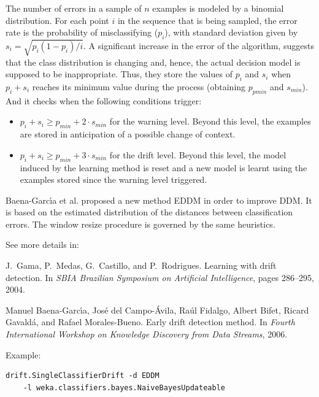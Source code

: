 \documentclass[a4paper,12pt,twoside]{book}
\begin{document}
The number of errors in a sample of $n$ examples is modeled by a binomial 
distribution. For each point $i$ in the sequence that is being sampled, the error
rate is the probability of misclassifying ($p_i$), with standard deviation given
by $s_i = \sqrt{p_i(1 - p_i)/i}$. 
A significant increase in the error of the algorithm, suggests
that the class distribution is changing and, hence, the actual decision model is
supposed to be inappropriate. Thus, they store the values of $p_i$ and $s_i$ when
$p_i+s_i$ reaches its minimum value during the process (obtaining $p_{pmin}$ and $s_{min}$).
And it checks when the following conditions trigger:
\begin{itemize}
\item $p_i + s_i \geq p_{min} + 2 \cdot s_{min}$ for the warning level. 
	Beyond this level, the examples are stored in anticipation of a possible
	change of context.
\item $p_i + s_i \geq p_{min} + 3 \cdot s_{min}$ for the drift level. Beyond this
	level, the model induced by the learning method is reset and a new model
	is learnt using the examples stored since the warning level triggered.
\end{itemize}

Baena-Garc\'{\i}a et al. proposed a new method EDDM in order to improve DDM. 
It is based on the estimated distribution of the distances between classification errors.
The window resize procedure is governed by the same heuristics.

See more details in:

\begin{itemize}
J.~Gama, P.~Medas, G.~Castillo, and P.~Rodrigues.
\newblock Learning with drift detection.
\newblock In {\em SBIA Brazilian Symposium on Artificial Intelligence}, pages
  286--295, 2004.

Manuel Baena-Garc\'{\i}a, Jos{\'e} del Campo-{\'A}vila, Ra\'ul Fidalgo, Albert
  Bifet, Ricard Gavald\'a, and Rafael Morales-Bueno.
\newblock Early drift detection method.
\newblock In {\em Fourth International Workshop on Knowledge Discovery from
  Data Streams}, 2006.\end{itemize}

Example:
\begin{footnotesize}\begin{verbatim}
drift.SingleClassifierDrift -d EDDM 
    -l weka.classifiers.bayes.NaiveBayesUpdateable
\end{verbatim}\end{footnotesize}
\end{document}

